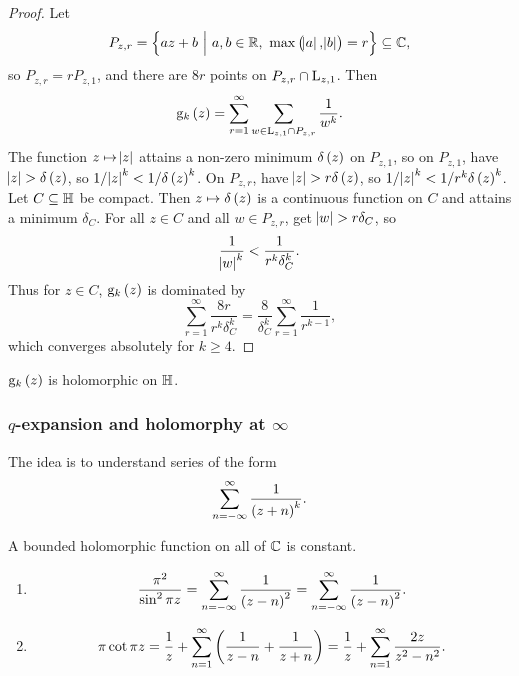\begin{proof}
Let
$$ P_{z, r} = \cbr{az + b \st a, b \in \RR, \ \max\br{\abs{a}, \abs{b}} = r} \subseteq \CC, $$
so $ P_{z, r} = rP_{z, 1} $, and there are $ 8r $ points on $ P_{z, r} \cap \mathrm{L}_{z, 1} $. Then
$$ \g_k\br{z} = \sum_{r = 1}^\infty \sum_{w \in \L_{z, 1} \cap P_{z, r}} \dfrac{1}{w^k}. $$
The function $ z \mapsto \abs{z} $ attains a non-zero minimum $ \delta\br{z} $ on $ P_{z, 1} $, so on $ P_{z, 1} $, have $ \abs{z} > \delta\br{z} $, so $ 1 / \abs{z}^k < 1 / \delta\br{z}^k $. On $ P_{z, r} $, have $ \abs{z} > r\delta\br{z} $, so $ 1 / \abs{z}^k < 1 / r^k\delta\br{z}^k $. Let $ C \subseteq \mathbb{H} $ be compact. Then $ z \mapsto \delta\br{z} $ is a continuous function on $ C $ and attains a minimum $ \delta_C $. For all $ z \in C $ and all $ w \in P_{z, r} $, get $ \abs{w} > r\delta_C $, so
$$ \dfrac{1}{\abs{w}^k} < \dfrac{1}{r^k\delta_C^k}. $$
Thus for $ z \in C $, $ \g_k\br{z} $ is dominated by
$$ \sum_{r = 1}^\infty \dfrac{8r}{r^k\delta_C^k} = \dfrac{8}{\delta_C^k}\sum_{r = 1}^\infty \dfrac{1}{r^{k - 1}}, $$
which converges absolutely for $ k \ge 4 $.
\end{proof}

\begin{corollary}
$ \g_k\br{z} $ is holomorphic on $ \mathbb{H} $.
\end{corollary}

\subsubsection{\texorpdfstring{$ q $}{q}-expansion and holomorphy at \texorpdfstring{$ \infty $}{infinity}}

The idea is to understand series of the form
$$ \sum_{n = -\infty}^\infty \dfrac{1}{\br{z + n}^k}. $$

\begin{theorem}
A bounded holomorphic function on all of $ \mathbb{C} $ is constant.
\end{theorem}

\begin{lemma}
\hfill
\begin{enumerate}
\item
$$ \dfrac{\pi^2}{\sin^2 \pi z} =  \sum_{n = -\infty}^\infty \dfrac{1}{\br{z - n}^2} = \sum_{n = -\infty}^\infty \dfrac{1}{\br{z - n}^2}. $$
\item
$$ \pi\cot \pi z = \dfrac{1}{z} + \sum_{n = 1}^\infty \br{\dfrac{1}{z - n} + \dfrac{1}{z + n}} = \dfrac{1}{z} + \sum_{n = 1}^\infty \dfrac{2z}{z^2 - n^2}. $$
\end{enumerate}
\end{lemma}

